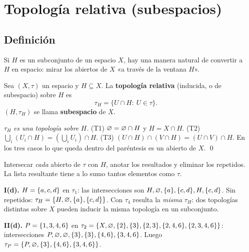 \section{Topología relativa (subespacios)}
\subsection{Definición}
Si $H$ es un subconjunto de un espacio $X$, hay una manera natural de convertir a $H$ en espacio: mirar los abiertos
de $X$ «a través de la ventana $H$».
\begin{definicion}
Sea $(X,\tau)$ un espacio y $H\subseteq X$. La \textbf{topología relativa} (inducida, o de subespacio) sobre $H$ es
\[\tau_H=\{U\cap H:\ U\in\tau\}.\]
$(H,\tau_H)$ se llama \textbf{subespacio} de $X$.
\end{definicion}
\emph{$\tau_H$ es una topología sobre $H$.} (T1) $\varnothing=\varnothing\cap H$ y $H=X\cap H$. (T2)
$\bigcup_i(U_i\cap H)=(\bigcup_iU_i)\cap H$. (T3) $(U\cap H)\cap(V\cap H)=(U\cap V)\cap H$. En los tres casos lo que
queda dentro del paréntesis es un abierto de $X$. \qed

\begin{metodo}
Intersecar \emph{cada} abierto de $\tau$ con $H$, anotar los resultados y eliminar los repetidos. La lista resultante
tiene a lo sumo tantos elementos como $\tau$.
\end{metodo}
\begin{ejemplo}
\textbf{I(d).} $H=\{a,c,d\}$ en $\tau_1$: las intersecciones son $H,\varnothing,\{a\},\{c,d\},H,\{c,d\}$. Sin repetidos:
$\tau_H=\{H,\varnothing,\{a\},\{c,d\}\}$. Con $\tau_4$ resulta la \emph{misma} $\tau_H$: dos topologías distintas sobre $X$
pueden inducir la misma topología en un subconjunto.

\textbf{II(d).} $P=\{1,3,4,6\}$ en $\tau_2=\{X,\varnothing,\{2\},\{3\},\{2,3\},\{2,4,6\},\{2,3,4,6\}\}$: intersecciones
$P,\varnothing,\varnothing,\{3\},\{3\},\{4,6\},\{3,4,6\}$. Luego $\tau_P=\{P,\varnothing,\{3\},\{4,6\},\{3,4,6\}\}$.
\end{ejemplo}

